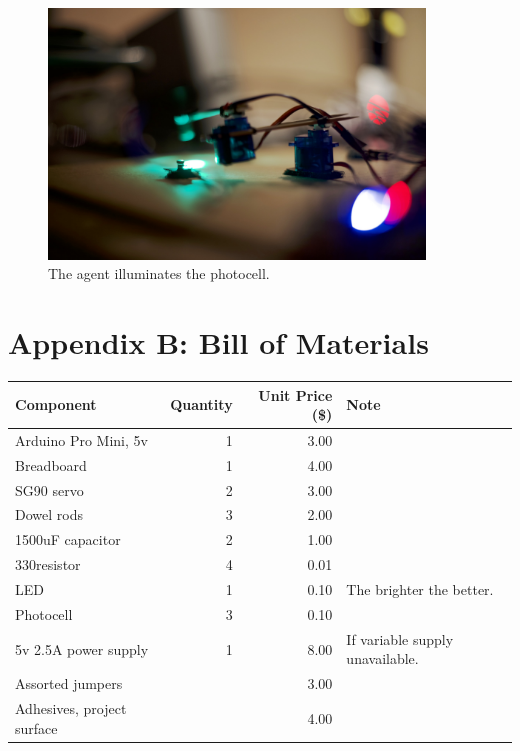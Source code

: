 \documentclass{article}
\begin{document}
		\begin{figure}[!htb]
			\centering
			\includegraphics[width=10cm]{../photos/action_detail_small.jpg}
			\caption{The agent illuminates the photocell.}
			\label{fig:breadboard}
		\end{figure}

	
	\section{Appendix B: Bill of Materials}
	

	\begin{center}
		\begin{tabular}{ l r r  p{5cm} }
			\hline
			Component & Quantity & Unit Price (\$) & Note \\ \hline
			Arduino Pro Mini, 5v & 1 & 3.00 &  \\ 
			Breadboard & 1 & 4.00 & \\
			SG90 servo & 2 & 3.00 & \\ 
			Dowel rods & 3 & 2.00 & \\
			1500uF capacitor & 2 & 1.00 & \\ 
			330\ohm\space resistor & 4 & 0.01 \\
			LED & 1 & 0.10 & The brighter the better.\\ 
			Photocell & 3 & 0.10 & \\ 
			5v 2.5A power supply & 1 & 8.00 & If variable supply unavailable. \\ 
			Assorted jumpers & & 3.00 & \\
			Adhesives, project surface & & 4.00 & \\
			\hline
		\end{tabular}
	\end{center}
	
	
\end{document}
